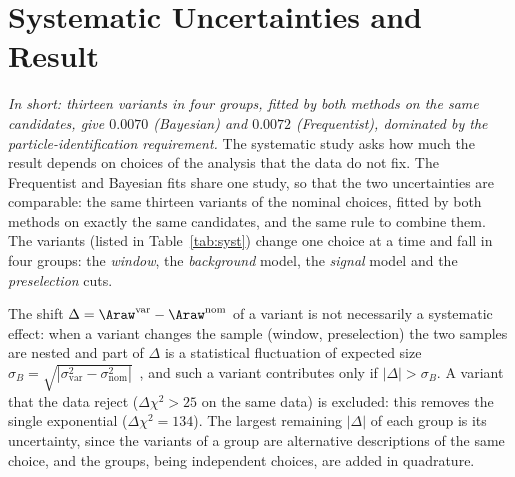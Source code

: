 \section{Systematic Uncertainties and Result}
\label{sec:syst}
\emph{In short: thirteen variants in four groups, fitted by both methods on the same candidates, give $0.0070$ (Bayesian) and $0.0072$ (Frequentist), dominated by the particle-identification requirement.}
The systematic study asks how much the result depends on choices of the analysis that the data do not fix. The Frequentist and Bayesian fits share one study, so that the two uncertainties are comparable: the same thirteen variants of the nominal choices, fitted by both methods on exactly the same candidates, and the same rule to combine them. The variants (listed in Table~\ref{tab:syst}) change one choice at a time and fall in four groups: the \emph{window}, the \emph{background} model, the \emph{signal} model and the \emph{preselection} cuts.

The shift $\Delta=\Araw^{\mathrm{var}}-\Araw^{\mathrm{nom}}$ of a variant is not necessarily a systematic effect: when a variant changes the sample (window, preselection) the two samples are nested and part of $\Delta$ is a statistical fluctuation of expected size $\sigma_B=\sqrt{|\sigma_{\mathrm{var}}^2-\sigma_{\mathrm{nom}}^2|}$~\cite{barlow}, and such a variant contributes only if $|\Delta|>\sigma_B$. A variant that the data reject ($\Delta\chi^2>25$ on the same data) is excluded: this removes the single exponential ($\Delta\chi^2=134$). The largest remaining $|\Delta|$ of each group is its uncertainty, since the variants of a group are alternative descriptions of the same choice, and the groups, being independent choices, are added in quadrature.

